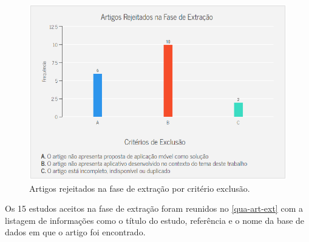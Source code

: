 \begin{figure}[htb]
	\caption{\label{fig_art_rej_fas_ext}Artigos rejeitados na fase de extração por critério exclusão.}
	\begin{center}
	    \includegraphics[scale=0.7]{Imagens/msl/artigos_rejeitados_fase_extracao.png}
	\end{center}
\end{figure}

Os 15 estudos aceitos na fase de extração foram reunidos no \autoref{qua-art-ext} com a listagem de informações como o título do estudo, referência e o nome da base de dados em que o artigo foi encontrado.

